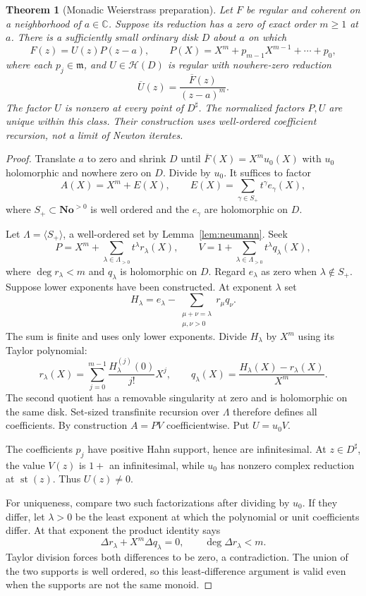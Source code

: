 \documentclass[11pt,a4paper]{article}
\numberwithin{equation}{section}
\newtheorem{theorem}{Theorem}[section]
\theoremstyle{definition}
\theoremstyle{remark}
\newcommand{\No}{\mathbf{No}}
\newcommand{\C}{\mathbb C}
\newcommand{\mm}{\mathfrak m}
\newcommand{\HH}{\mathscr H}
\newcommand{\st}{\operatorname{st}}
\begin{document}
\begin{theorem}[Monadic Weierstrass preparation]
\label{thm:preparation}
Let $F$ be regular and coherent on a neighborhood of $a\in\C$. Suppose its reduction has a zero of exact order $m\geq1$ at $a$. There is a sufficiently small ordinary disk $D$ about $a$ on which
\begin{equation}
\label{eq:prep}
 F(z)=U(z)P(z-a),\qquad
 P(X)=X^m+p_{m-1}X^{m-1}+\cdots+p_0,
\end{equation}
where each $p_j\in\mm$, and $U\in\HH(D)$ is regular with nowhere-zero reduction
\[
 \overline U(z)=\frac{\overline F(z)}{(z-a)^m}.
\]
The factor $U$ is nonzero at every point of $D^\sharp$. The normalized factors $P,U$ are unique within this class. Their construction uses well-ordered coefficient recursion, not a limit of Newton iterates.
\end{theorem}
\begin{proof}
Translate $a$ to zero and shrink $D$ until
$\overline F(X)=X^m u_0(X)$ with $u_0$ holomorphic and nowhere zero on $D$. Divide by $u_0$. It suffices to factor
\[
 A(X)=X^m+E(X),\qquad
 E(X)=\sum_{\gamma\in S_+}t^\gamma e_\gamma(X),
\]
where $S_+\subset\No^{>0}$ is well ordered and the $e_\gamma$ are holomorphic on $D$.

Let $\Lambda=\langle S_+\rangle$, a well-ordered set by Lemma~\ref{lem:neumann}. Seek
\[
 P=X^m+\sum_{\lambda\in\Lambda_{>0}}t^\lambda r_\lambda(X),
 \qquad V=1+\sum_{\lambda\in\Lambda_{>0}}t^\lambda q_\lambda(X),
\]
where $\deg r_\lambda<m$ and $q_\lambda$ is holomorphic on $D$. Regard $e_\lambda$ as zero when $\lambda\notin S_+$. Suppose lower exponents have been constructed. At exponent $\lambda$ set
\[
 H_\lambda=e_\lambda-
 \sum_{\substack{\mu+\nu=\lambda\\\mu,\nu>0}}
 r_\mu q_\nu.
\]
The sum is finite and uses only lower exponents. Divide $H_\lambda$ by $X^m$ using its Taylor polynomial:
\begin{equation}
\label{eq:preprecursion}
 r_\lambda(X)=\sum_{j=0}^{m-1}\frac{H_\lambda^{(j)}(0)}{j!}X^j,
 \qquad
 q_\lambda(X)=\frac{H_\lambda(X)-r_\lambda(X)}{X^m}.
\end{equation}
The second quotient has a removable singularity at zero and is holomorphic on the same disk. Set-sized transfinite recursion over $\Lambda$ therefore defines all coefficients. By construction $A=PV$ coefficientwise. Put $U=u_0V$.

The coefficients $p_j$ have positive Hahn support, hence are infinitesimal. At $z\in D^\sharp$, the value $V(z)$ is $1+$ an infinitesimal, while $u_0$ has nonzero complex reduction at $\st(z)$. Thus $U(z)\ne0$.

For uniqueness, compare two such factorizations after dividing by $u_0$. If they differ, let $\lambda>0$ be the least exponent at which the polynomial or unit coefficients differ. At that exponent the product identity says
\[
 \Delta r_\lambda+X^m\Delta q_\lambda=0,
 \qquad \deg\Delta r_\lambda<m.
\]
Taylor division forces both differences to be zero, a contradiction. The union of the two supports is well ordered, so this least-difference argument is valid even when the supports are not the same monoid.
\end{proof}
\end{document}
